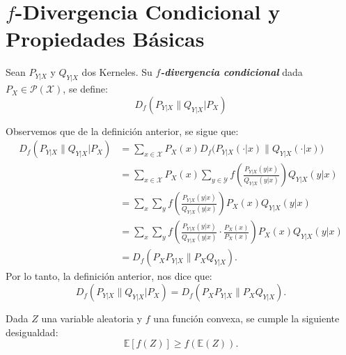 \section{$f$-Divergencia Condicional
y Propiedades B\'asicas}
\begin{definition}
    Sean $P_{Y|X}$ y $Q_{Y|X}$ dos Kerneles. Su \textit{\textbf{$f$-divergencia condicional}} dada $P_{X}\in\mathcal{P}(\mathcal{X})$, se define:
    \begin{equation*}
        D_f(P_{Y|X}\|Q_{Y|X}|P_{X})
    \end{equation*}
\end{definition}
\begin{observation}
Observemos que de la definici\'on anterior, se sigue que:
\begin{align*}
    D_f(P_{Y|X}\|Q_{Y|X}|P_{X})&=\sum_{x\in\mathcal{X}}P_{X}(x)D_f\bigl(P_{Y|X}(\cdot|x)\big\|Q_{Y|X}(\cdot|x)\bigl)\\
    &=\sum_{x\in\mathcal{X}}P_{X}(x)\sum_{y\in\mathcal{Y}}f\left(\frac{P_{Y|X}(y|x)}{Q_{Y|X}(y|x)}\right)Q_{Y|X}(y|x)\\
    &=\sum_{x}\sum_{y}f\left(\frac{P_{Y|X}(y|x)}{Q_{Y|X}(y|x)}\right)P_X(x)Q_{Y|X}(y|x)\\
    &=\sum_{x}\sum_{y}f\left(\frac{P_{Y|X}(y|x)}{Q_{Y|X}(y|x)}\cdot\frac{P_X(x)}{P_X(x)}\right)P_X(x)Q_{Y|X}(y|x)\\
    &=D_f(P_XP_{Y|X}\|P_XQ_{Y|X}).
\end{align*}
Por lo tanto, la definici\'on anterior, nos dice que:
\begin{equation*}
    D_f(P_{Y|X}\|Q_{Y|X}|P_{X})=D_f(P_XP_{Y|X}\|P_XQ_{Y|X}).
\end{equation*}
\end{observation}
\begin{theorem}
    Dada $Z$ una variable aleatoria y $f$ una funci\'on convexa, se cumple la siguiente desigualdad:
    \begin{equation*}
        \mathbb{E}\left[f(Z)\right]\geq f(\mathbb{E}(Z)).
    \end{equation*}
\end{theorem}

